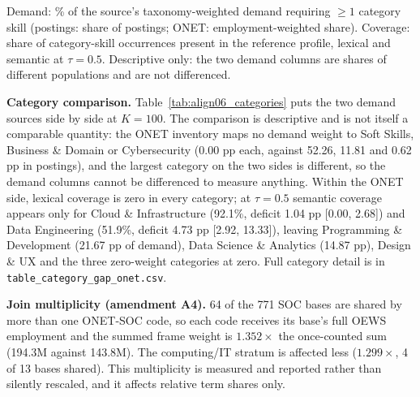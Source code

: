 \documentclass[journal]{IEEEtran}
\begin{document}
\begin{table}[!htbp]
\centering
\caption{Eight-Category Demand Shares and Coverage, Posting Market against O\*NET~$\times$ BLS (ALIGN06, $K = 100$)}
\label{tab:align06_categories}
\resizebox{\columnwidth}{!}{%

}
\par\vspace{3pt}
{\footnotesize Demand: \% of the source's taxonomy-weighted demand requiring $\ge 1$ category skill (postings: share of postings; O\*NET: employment-weighted share). Coverage: share of category-skill occurrences present in the reference profile, lexical and semantic at $\tau = 0.5$. Descriptive only: the two demand columns are shares of different populations and are not differenced.}
\end{table}

\textbf{Category comparison.} Table~\ref{tab:align06_categories} puts the two demand sources side by side at $K = 100$. The comparison is descriptive and is not itself a comparable quantity: the O\*NET inventory maps no demand weight to Soft Skills, Business \& Domain or Cybersecurity (0.00 pp each, against 52.26, 11.81 and 0.62 pp in postings), and the largest category on the two sides is different, so the demand columns cannot be differenced to measure anything. Within the O\*NET side, lexical coverage is zero in every category; at $\tau = 0.5$ semantic coverage appears only for Cloud \& Infrastructure (92.1\%, deficit 1.04 pp [0.00, 2.68]) and Data Engineering (51.9\%, deficit 4.73 pp [2.92, 13.33]), leaving Programming \& Development (21.67 pp of demand), Data Science \& Analytics (14.87 pp), Design \& UX and the three zero-weight categories at zero. Full category detail is in \texttt{table\_category\_gap\_onet.csv}.

\textbf{Join multiplicity (amendment A4).} 64 of the 771 SOC bases are shared by more than one O\*NET-SOC code, so each code receives its base's full OEWS employment and the summed frame weight is $1.352\times$ the once-counted sum (194.3M against 143.8M). The computing/IT stratum is affected less ($1.299\times$, 4 of 13 bases shared). This multiplicity is measured and reported rather than silently rescaled, and it affects relative term shares only.

\clearpage
\end{document}
